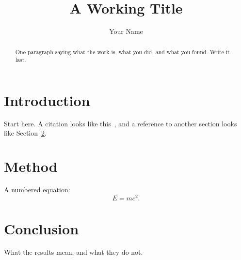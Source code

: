\documentclass[runningheads]{llncs}
\begin{document}
\title{A Working Title}
\author{Your Name}

\maketitle

\begin{abstract}
One paragraph saying what the work is, what you did, and what you found.
Write it last.
\end{abstract}

\section{Introduction}
\label{sec:introduction}

Start here.  A citation looks like this~\cite{knuth1984}, and a reference to
another section looks like Section~\ref{sec:method}.

\section{Method}
\label{sec:method}

A numbered equation:
\begin{equation}
  \label{eq:example}
  E = mc^2.
\end{equation}

\section{Conclusion}

What the results mean, and what they do not.



\end{document}

